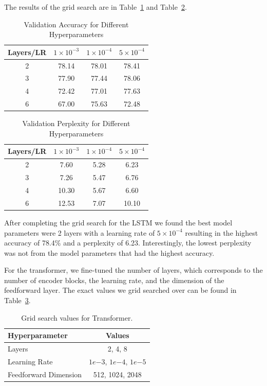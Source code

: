 \documentclass[11pt]{article}
\begin{document}
The results of the grid search are in Table~\ref{tab:tab1} and Table~\ref{tab:tab2}. 

\begin{table}[ht]
    \centering
    \begin{tabular}{|c|c|c|c|}
    \hline
    \textbf{Layers/LR} & $1 \times 10^{-3}$ & $1 \times 10^{-4}$ & $5 \times 10^{-4}$ \\
    \hline
 2 & 78.14 & 78.01 & 78.41 \\
 3 & 77.90 & 77.44 & 78.06 \\
 4 & 72.42 & 77.01 & 77.63 \\
 6 & 67.00 & 75.63 & 72.48 \\
    \hline
    \end{tabular}
    \caption{Validation Accuracy for Different Hyperparameters}
    \label{tab:tab1}
\end{table}
    

\begin{table}[ht]
    \centering
    \begin{tabular}{|c|c|c|c|}
    \hline
    \textbf{Layers/LR} & $1 \times 10^{-3}$ & $1 \times 10^{-4}$ & $5 \times 10^{-4}$ \\
    \hline
 2 & 7.60  & 5.28 & 6.23 \\
 3 & 7.26  & 5.47 & 6.76 \\
 4 & 10.30 & 5.67 & 6.60 \\
 6 & 12.53 & 7.07 & 10.10 \\
    \hline
    \end{tabular}
    \caption{Validation Perplexity for Different Hyperparameters}
    \label{tab:tab2}
\end{table}
    

After completing the grid search for the LSTM we found the best model parameters were 2 layers with a learning rate of \(5\times10^{-4}\) resulting in the highest accuracy of 78.4\% and a perplexity of 6.23. Interestingly, the lowest perplexity was not from the model parameters that had the highest accuracy.

For the transformer, we fine-tuned the number of layers, which corresponds to the number of encoder blocks, the learning rate, and the dimension of the feedforward layer. The exact values we grid searched over can be found in Table~\ref{tab:hypert}.

\begin{table}[H]
    \centering
    \caption{Grid search values for Transformer.}
    \label{tab:hypert}
    \begin{tabular}{l c}
        \toprule
        \textbf{Hyperparameter} & \textbf{Values} \\
        \midrule
 Layers & 2, 4, 8 \\
 Learning Rate & \(1e{-3}\), \(1e{-4}\), \(1e{-5}\) \\
 Feedforward Dimension & 512, 1024, 2048 \\
        \bottomrule
    \end{tabular}
\end{table}
\end{document}
